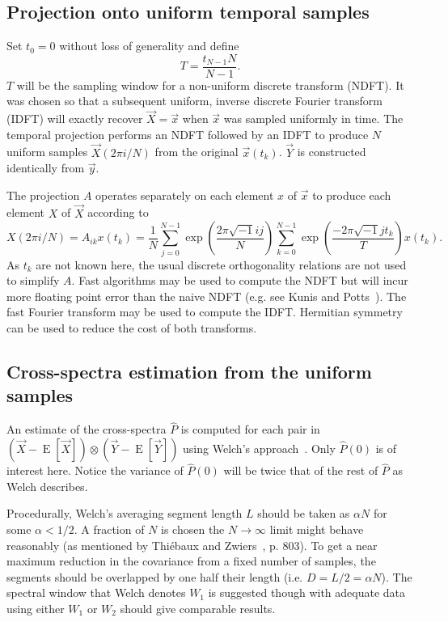 \documentclass[letterpaper,11pt,nointlimits,reqno]{amsart}
\begin{document}
\subsection*{Projection onto uniform temporal samples}

Set $t_0=0$ without loss of generality and define
$$
T = \frac{t_{N-1} N}{N-1}.
$$
$T$ will be the sampling window for a non-uniform discrete transform (NDFT).
It was chosen so that a subsequent uniform, inverse discrete Fourier transform
(IDFT) will exactly recover $\vec{X}=\vec{x}$ when $\vec{x}$ was sampled
uniformly in time.  The temporal projection performs an NDFT followed by an
IDFT to produce $N$ uniform samples $\vec{X}\left(2\pi{}i/N\right)$ from the
original $\vec{x}\left(t_k\right)$.  $\vec{Y}$ is constructed identically from
$\vec{y}$.

The projection $A$ operates separately on each element $x$ of $\vec{x}$
to produce each element $X$ of $\vec{X}$ according to
$$
    X\left(2\pi{}i/N\right)
    =
    A_{ik} x\left(t_k\right)
    =
    \frac{1}{N}
    \sum_{j=0}^{N-1} \exp\left(\frac{ 2\pi\sqrt{-1} i j   }{N} \right)
    \sum_{k=0}^{N-1} \exp\left(\frac{-2\pi\sqrt{-1} j t_k }{T} \right)
    x\left(t_k\right)
.
$$
As $t_k$ are not known here, the usual discrete orthogonality relations are not
used to simplify $A$.  Fast algorithms may be used to compute the NDFT but will
incur more floating point error than the naive NDFT (e.g. see Kunis and
Potts~\cite{Kunis2008Time}).  The fast Fourier transform may be used to compute
the IDFT.  Hermitian symmetry can be used to reduce the cost of both
transforms.

\subsection*{Cross-spectra estimation from the uniform samples}

An estimate of the cross-spectra $\hat{P}$ is computed for each pair in
$\left(\vec{X} - \operatorname{E}\left[\vec{X}\right]\right) \otimes
\left(\vec{Y} - \operatorname{E}\left[\vec{Y}\right]\right)$ using Welch's
approach~\cite{Welch1967Use}.  Only $\hat{P}(0)$ is of interest here.  Notice
the variance of $\hat{P}(0)$ will be twice that of the rest of $\hat{P}$
as Welch describes.

Procedurally, Welch's averaging segment length $L$ should be taken as
$\alpha{}N$ for some $\alpha<1/2$.  A fraction of $N$ is chosen the
$N\to\infty$ limit might behave reasonably (as mentioned by Thi\'{e}baux and
Zwiers~\cite{Thiebaux1984Interpretation}, p. 803).  To get a near maximum
reduction in the covariance from a fixed number of samples, the segments should
be overlapped by one half their length (i.e.  $D = L / 2 = \alpha{}N$).  The
spectral window that Welch denotes $W_1$ is suggested though with adequate data
using either $W_1$ or $W_2$ should give comparable results.
\end{document}

